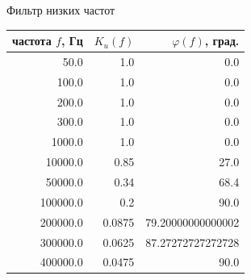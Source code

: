 \documentclass[10pt,a5paper]{article}
\begin{document}
\begin{center}
\Large Фильтр низких частот
\end{center}

\small
\begin{center}
\begin{tabular}{rrr}
\toprule
частота $f$, Гц & \hspace{1mm} $K_u(f)$ & \hspace{1mm} $\varphi(f)$, град. \\
\midrule
\num[round-mode=places,round-precision=0]{50.0} & \num[round-mode=places,round-precision=3]{1.0} & \num[round-mode=places,round-precision=3]{0.0} \\
\num[round-mode=places,round-precision=0]{100.0} & \num[round-mode=places,round-precision=3]{1.0} & \num[round-mode=places,round-precision=3]{0.0} \\
\num[round-mode=places,round-precision=0]{200.0} & \num[round-mode=places,round-precision=3]{1.0} & \num[round-mode=places,round-precision=3]{0.0} \\
\num[round-mode=places,round-precision=0]{300.0} & \num[round-mode=places,round-precision=3]{1.0} & \num[round-mode=places,round-precision=3]{0.0} \\
\num[round-mode=places,round-precision=0]{1000.0} & \num[round-mode=places,round-precision=3]{1.0} & \num[round-mode=places,round-precision=3]{0.0} \\
\num[round-mode=places,round-precision=0]{10000.0} & \num[round-mode=places,round-precision=3]{0.85} & \num[round-mode=places,round-precision=3]{27.0} \\
\num[round-mode=places,round-precision=0]{50000.0} & \num[round-mode=places,round-precision=3]{0.34} & \num[round-mode=places,round-precision=3]{68.4} \\
\num[round-mode=places,round-precision=0]{100000.0} & \num[round-mode=places,round-precision=3]{0.2} & \num[round-mode=places,round-precision=3]{90.0} \\
\num[round-mode=places,round-precision=0]{200000.0} & \num[round-mode=places,round-precision=3]{0.0875} & \num[round-mode=places,round-precision=3]{79.20000000000002} \\
\num[round-mode=places,round-precision=0]{300000.0} & \num[round-mode=places,round-precision=3]{0.0625} & \num[round-mode=places,round-precision=3]{87.27272727272728} \\
\num[round-mode=places,round-precision=0]{400000.0} & \num[round-mode=places,round-precision=3]{0.0475} & \num[round-mode=places,round-precision=3]{90.0} \\

\end{tabular}
\end{center}
\end{document}
